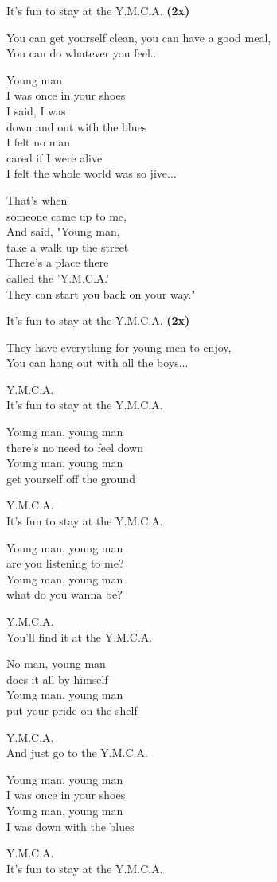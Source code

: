 It's fun to stay at the Y.M.C.A. \textbf{(2x)}

You can get yourself clean, you can have a good meal,\\
You can do whatever you feel...

Young man\\
I was once in your shoes\\
I said, I was\\
down and out with the blues\\
I felt no man\\
cared if I were alive\\
I felt the whole world was so jive...

That's when\\
someone came up to me,\\
And said, "Young man,\\
take a walk up the street\\
There's a place there\\
called the 'Y.M.C.A.'\\
They can start you back on your way."

It's fun to stay at the Y.M.C.A. \textbf{(2x)}

They have everything for young men to enjoy,\\
You can hang out with all the boys...

Y.M.C.A.\\
It's fun to stay at the Y.M.C.A.

Young man, young man\\
there's no need to feel down\\
Young man, young man\\
get yourself off the ground

Y.M.C.A.\\
It's fun to stay at the Y.M.C.A.

Young man, young man\\
are you listening to me?\\
Young man, young man\\
what do you wanna be?

Y.M.C.A.\\
You'll find it at the Y.M.C.A.

No man, young man\\
does it all by himself\\
Young man, young man\\
put your pride on the shelf

Y.M.C.A.\\
And just go to the Y.M.C.A.

Young man, young man\\
I was once in your shoes\\
Young man, young man\\
I was down with the blues

Y.M.C.A.\\
It's fun to stay at the Y.M.C.A.